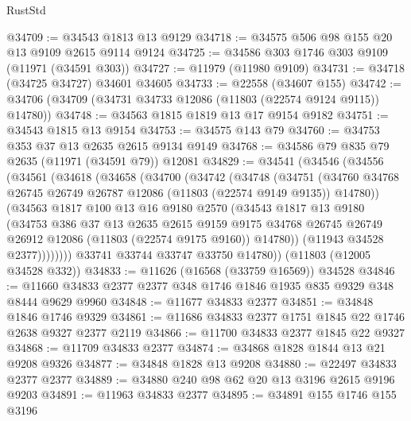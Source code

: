 \begin{lexlean}{RustStd}
\begin{coremodule}
@34709 := @34543 @1813 @13 @9129
@34718 := @34575 @506 @98 @155 @20 @13 @9109 @2615 @9114 @9124
@34725 := @34586 @303 @1746 @303 @9109 (@11971 (@34591 @303))
@34727 := @11979 (@11980 @9109)
@34731 := @34718 (@34725 @34727) @34601 @34605
@34733 := @22558 (@34607 @155)
@34742 := @34706 (@34709 (@34731 @34733 @12086 (@11803 (@22574 @9124 @9115)) @14780))
@34748 := @34563 @1815 @1819 @13 @17 @9154 @9182
@34751 := @34543 @1815 @13 @9154
@34753 := @34575 @143 @79
@34760 := @34753 @353 @37 @13 @2635 @2615 @9134 @9149
@34768 := @34586 @79 @835 @79 @2635 (@11971 (@34591 @79)) @12081
@34829 := @34541
    (@34546
      (@34556
        (@34561
          (@34618
            (@34658
              (@34700
                (@34742
                  (@34748
                    (@34751
                      (@34760
                        @34768
                        @26745
                        @26749
                        @26787
                        @12086
                        (@11803 (@22574 @9149 @9135))
                        @14780))
                    (@34563
                      @1817
                      @100
                      @13
                      @16
                      @9180
                      @2570
                      (@34543
                        @1817
                        @13
                        @9180
                        (@34753
                          @386
                          @37
                          @13
                          @2635
                          @2615
                          @9159
                          @9175
                          @34768
                          @26745
                          @26749
                          @26912
                          @12086
                          (@11803 (@22574 @9175 @9160))
                          @14780))
                      (@11943 @34528 @2377))))))))
        @33741
        @33744
        @33747
        @33750
        @14780))
    (@11803 (@12005 @34528 @332))
@34833 := @11626 (@16568 (@33759 @16569)) @34528
@34846 := @11660 @34833 @2377 @2377 @348 @1746 @1846 @1935 @835 @9329 @348 @8444 @9629 @9960
@34848 := @11677 @34833 @2377
@34851 := @34848 @1846 @1746 @9329
@34861 := @11686 @34833 @2377 @1751 @1845 @22 @1746 @2638 @9327 @2377 @2119
@34866 := @11700 @34833 @2377 @1845 @22 @9327
@34868 := @11709 @34833 @2377
@34874 := @34868 @1828 @1844 @13 @21 @9208 @9326
@34877 := @34848 @1828 @13 @9208
@34880 := @22497 @34833 @2377 @2377
@34889 := @34880 @240 @98 @62 @20 @13 @3196 @2615 @9196 @9203
@34891 := @11963 @34833 @2377
@34895 := @34891 @155 @1746 @155 @3196

\end{coremodule}
\end{lexlean}

